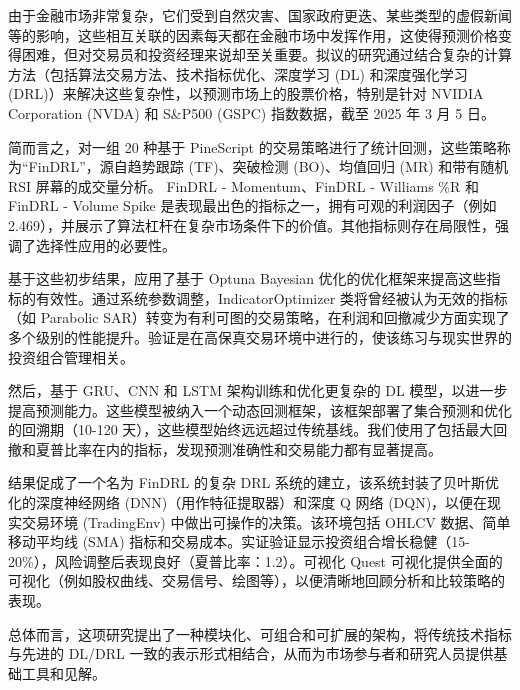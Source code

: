 由于金融市场非常复杂，它们受到自然灾害、国家政府更迭、某些类型的虚假新闻等的影响，这些相互关联的因素每天都在金融市场中发挥作用，这使得预测价格变得困难，但对交易员和投资经理来说却至关重要。拟议的研究通过结合复杂的计算方法（包括算法交易方法、技术指标优化、深度学习 (DL) 和深度强化学习 (DRL)）来解决这些复杂性，以预测市场上的股票价格，特别是针对 NVIDIA Corporation (NVDA) 和 S\&P500 (GSPC) 指数数据，截至 2025 年 3 月 5 日。

简而言之，对一组 20 种基于 PineScript 的交易策略进行了统计回测，这些策略称为“FinDRL”，源自趋势跟踪 (TF)、突破检测 (BO)、均值回归 (MR) 和带有随机 RSI 屏幕的成交量分析。 FinDRL - Momentum、FinDRL - Williams \%R 和 FinDRL - Volume Spike 是表现最出色的指标之一，拥有可观的利润因子（例如 2.469），并展示了算法杠杆在复杂市场条件下的价值。其他指标则存在局限性，强调了选择性应用的必要性。

基于这些初步结果，应用了基于 Optuna Bayesian 优化的优化框架来提高这些指标的有效性。通过系统参数调整，IndicatorOptimizer 类将曾经被认为无效的指标（如 Parabolic SAR）转变为有利可图的交易策略，在利润和回撤减少方面实现了多个级别的性能提升。验证是在高保真交易环境中进行的，使该练习与现实世界的投资组合管理相关。

然后，基于 GRU、CNN 和 LSTM 架构训练和优化更复杂的 DL 模型，以进一步提高预测能力。这些模型被纳入一个动态回测框架，该框架部署了集合预测和优化的回溯期（10-120 天），这些模型始终远远超过传统基线。我们使用了包括最大回撤和夏普比率在内的指标，发现预测准确性和交易能力都有显著提高。

结果促成了一个名为 FinDRL 的复杂 DRL 系统的建立，该系统封装了贝叶斯优化的深度神经网络 (DNN)（用作特征提取器）和深度 Q 网络 (DQN)，以便在现实交易环境 (TradingEnv) 中做出可操作的决策。该环境包括 OHLCV 数据、简单移动平均线 (SMA) 指标和交易成本。实证验证显示投资组合增长稳健（15-20\%），风险调整后表现良好（夏普比率：1.2）。可视化 Quest 可视化提供全面的可视化（例如股权曲线、交易信号、绘图等），以便清晰地回顾分析和比较策略的表现。

总体而言，这项研究提出了一种模块化、可组合和可扩展的架构，将传统技术指标与先进的 DL/DRL 一致的表示形式相结合，从而为市场参与者和研究人员提供基础工具和见解。